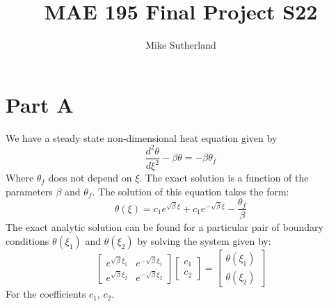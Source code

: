 \documentclass[10pt,letterpaper,notitlepage]{article}
\author{Mike Sutherland}
\title{MAE 195 Final Project S22}
\begin{document}
    \maketitle
    \tableofcontents
    \listoffigures
    \section{Part A}
    \label{sec:parta}
    We have a steady state non-dimensional heat equation given by
    \begin{equation}
        \frac{d^2 \theta}{d\xi^2} - \beta \theta = -\beta \theta_f
        \label{eq:ss}
    \end{equation}
    Where $\theta_f$ does not depend on $\xi$. The exact solution is a function of the parameters $\beta$ and $\theta_f$. The solution of this equation takes the form:
    \begin{equation}
        \theta(\xi) = c_1 e^{\sqrt{\beta} \xi} + c_1 e^{-\sqrt{\beta} \xi} - \frac{\theta_f}{\beta}
    \end{equation}
    The exact analytic solution can be found for a particular pair of boundary conditions $\theta(\xi_1)$ and $\theta(\xi_2)$ by solving the system given by:
    \begin{equation}
        \begin{bmatrix}
            e^{\sqrt{\beta} \xi_1} & e^{-\sqrt{\beta} \xi_1} \\
            e^{\sqrt{\beta} \xi_2} & e^{-\sqrt{\beta} \xi_2} 
        \end{bmatrix}
        \begin{bmatrix}
            c_1 \\
            c_2
        \end{bmatrix}
        =
        \begin{bmatrix}
            \theta(\xi_1) \\
            \theta(\xi_2)
        \end{bmatrix}
    \end{equation}
    For the coefficients $c_1$, $c_2$.
\end{document}
